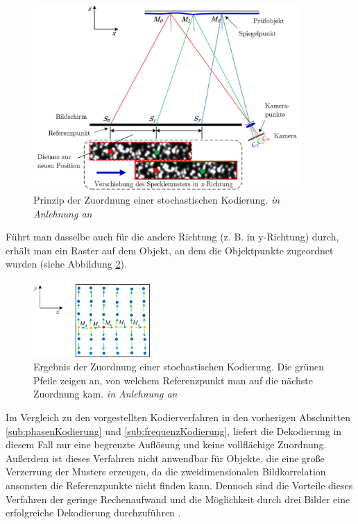 \begin{figure}[H]
	\centering
	\includegraphics[width=0.9\textwidth]{02_grundlagenDerDeflektometrie/rekonstruktion/stochastischeKodierung/figures/Prinzip}
	\caption[Prinzip der Zuordnung einer stochastischen Kodierung]{Prinzip der Zuordnung einer stochastischen Kodierung. \textit{in Anlehnung an} \cite{specklePattern}}
	\label{img:prinzipStoKodierung}
\end{figure}
%
\noindent
Führt man dasselbe auch für die andere Richtung (z. B. in y-Richtung) durch, erhält man ein Raster auf dem Objekt, an dem die Objektpunkte zugeordnet wurden (siehe Abbildung \ref{img:ergebnisStoKodierung}).
%
\begin{figure}[H]
	\centering
	\includegraphics[width=0.4\textwidth]{02_grundlagenDerDeflektometrie/rekonstruktion/stochastischeKodierung/figures/Ergebnis}
	\caption[Ergebnis der Zuordnung einer stochastischen Kodierung]{Ergebnis der Zuordnung einer stochastischen Kodierung. Die grünen Pfeile zeigen an, von welchem Referenzpunkt man auf die nächste Zuordnung kam. \textit{in Anlehnung an} \cite{specklePattern}}
	\label{img:ergebnisStoKodierung}
\end{figure}
%
\noindent
Im Vergleich zu den vorgestellten Kodierverfahren in den vorherigen Abschnitten \ref{sub:phasenKodierung} und \ref{sub:frequenzKodierung}, liefert die Dekodierung in diesem Fall nur eine begrenzte Auflösung und keine vollflächige Zuordnung.
Außerdem ist dieses Verfahren nicht anwendbar für Objekte, die eine große Verzerrung der Musters erzeugen, da die zweidimensionalen Bildkorrelation ansonsten die Referenzpunkte nicht finden kann.
Dennoch sind die Vorteile dieses Verfahren der geringe Rechenaufwand und die Möglichkeit durch drei Bilder eine erfolgreiche Dekodierung durchzuführen \cite{specklePattern}.